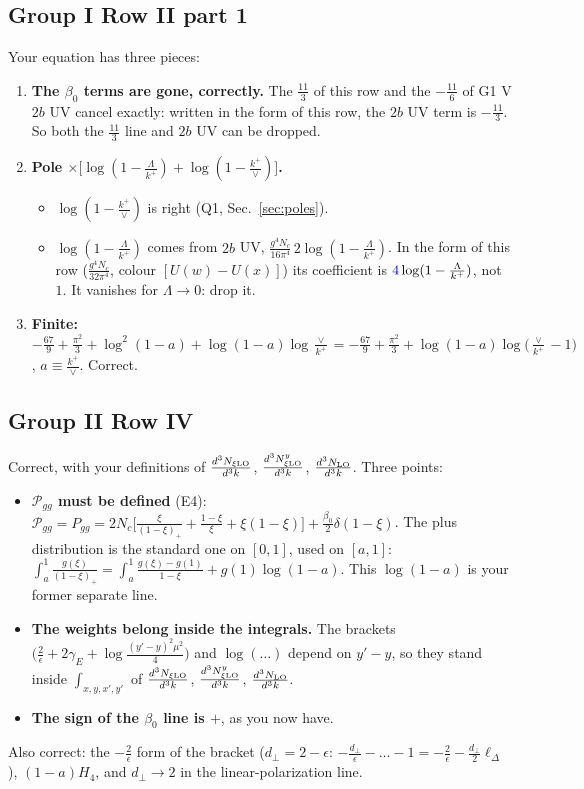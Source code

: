 \documentclass[10pt]{article}
\numberwithin{equation}{section}
\newcommand{\new}[1]{{\color{blue}#1}}
\begin{document}
\subsection{Group I Row II part 1}\label{sec:g1ii}
Your equation has three pieces:
\begin{enumerate}
\item \textbf{The $\beta_0$ terms are gone, correctly.} The $\frac{11}{3}$ of this row and the $-\frac{11}{6}$ of G1 V $2b$ UV cancel exactly: written in the form of this row, the $2b$ UV term is $-\frac{11}{3}$. So both the $\frac{11}{3}$ line and $2b$ UV can be dropped.
\item \textbf{Pole $\times\big[\log(1-\frac{\Lambda}{k^+})+\log(1-\frac{k^+}{\vee})\big]$.}
\begin{itemize}
\item $\log(1-\frac{k^+}{\vee})$ is right (Q1, Sec.~\ref{sec:poles}).
\item $\log(1-\frac{\Lambda}{k^+})$ comes from $2b$ UV, $\frac{g^4N_c}{16\pi^4}\,2\log(1-\frac{\Lambda}{k^+})$. In the form of this row ($\frac{g^4N_c}{32\pi^4}$, colour $[U(w)-U(x)]$) its coefficient is $\new{4}\log(1-\frac{\Lambda}{k^+})$, not $1$. It vanishes for $\Lambda\to0$: drop it.
\end{itemize}
\item \textbf{Finite:} $-\frac{67}{9}+\frac{\pi^2}{3}+\log^2(1-a)+\log(1-a)\log\frac{\vee}{k^+}=-\frac{67}{9}+\frac{\pi^2}{3}+\log(1-a)\log\big(\frac{\vee}{k^+}-1\big)$, $a\equiv\frac{k^+}{\vee}$. Correct.
\end{enumerate}

\subsection{Group II Row IV}
Correct, with your definitions of $\frac{d^3N_{\xi\rm LO}}{d^3k}$, $\frac{d^3N^y_{\xi\rm LO}}{d^3k}$, $\frac{d^3N_{\rm LO}}{d^3k}$. Three points:
\begin{itemize}
\item \textbf{$\mathcal P_{gg}$ must be defined} (E4): $\mathcal P_{gg}=P_{gg}=2N_c\big[\frac{\xi}{(1-\xi)_+}+\frac{1-\xi}{\xi}+\xi(1-\xi)\big]+\frac{\beta_0}{2}\delta(1-\xi)$. The plus distribution is the standard one on $[0,1]$, used on $[a,1]$: $\int_a^1\frac{g(\xi)}{(1-\xi)_+}=\int_a^1\frac{g(\xi)-g(1)}{1-\xi}+g(1)\log(1-a)$. This $\log(1-a)$ is your former separate line.
\item \textbf{The weights belong inside the integrals.} The brackets $\big(\frac2\epsilon+2\gamma_E+\log\frac{(y'-y)^2\mu^2}{4}\big)$ and $\log(\dots)$ depend on $y'-y$, so they stand inside $\int_{x,y,x',y'}$ of $\frac{d^3N_{\xi\rm LO}}{d^3k}$, $\frac{d^3N^y_{\xi\rm LO}}{d^3k}$, $\frac{d^3N_{\rm LO}}{d^3k}$.
\item \textbf{The sign of the $\beta_0$ line is $+$}, as you now have.
\end{itemize}
Also correct: the $-\frac{2}{\epsilon}$ form of the bracket ($d_\perp=2-\epsilon$: $-\frac{d_\perp}{\epsilon}-\dots-1=-\frac2\epsilon-\frac{d_\perp}{2}\ell_\Delta$), $(1-a)H_4$, and $d_\perp\to2$ in the linear-polarization line.
\end{document}
